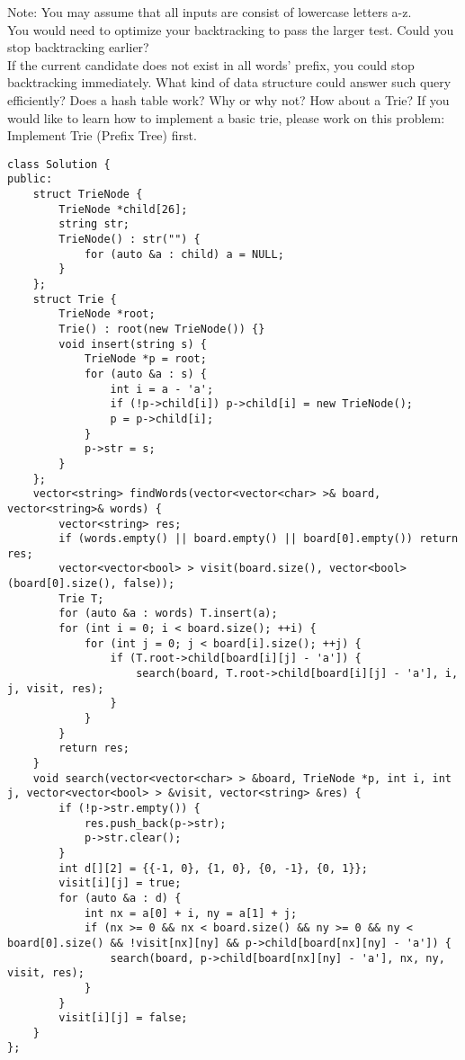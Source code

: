 Note:
You may assume that all inputs are consist of lowercase letters a-z.\\

You would need to optimize your backtracking to pass the larger test. Could you stop backtracking earlier?\\

If the current candidate does not exist in all words' prefix, you could stop backtracking immediately. What kind of data structure could answer such query efficiently? Does a hash table work? Why or why not? How about a Trie? If you would like to learn how to implement a basic trie, please work on this problem: Implement Trie (Prefix Tree) first.\\

\begin{lstlisting}
class Solution {
public:
    struct TrieNode {
        TrieNode *child[26];
        string str;
        TrieNode() : str("") {
            for (auto &a : child) a = NULL;
        }
    };
    struct Trie {
        TrieNode *root;
        Trie() : root(new TrieNode()) {}
        void insert(string s) {
            TrieNode *p = root;
            for (auto &a : s) {
                int i = a - 'a';
                if (!p->child[i]) p->child[i] = new TrieNode();
                p = p->child[i];
            }
            p->str = s;
        }
    };
    vector<string> findWords(vector<vector<char> >& board, vector<string>& words) {
        vector<string> res;
        if (words.empty() || board.empty() || board[0].empty()) return res;
        vector<vector<bool> > visit(board.size(), vector<bool>(board[0].size(), false));
        Trie T;
        for (auto &a : words) T.insert(a);
        for (int i = 0; i < board.size(); ++i) {
            for (int j = 0; j < board[i].size(); ++j) {
                if (T.root->child[board[i][j] - 'a']) {
                    search(board, T.root->child[board[i][j] - 'a'], i, j, visit, res);
                }
            }
        }
        return res;
    }
    void search(vector<vector<char> > &board, TrieNode *p, int i, int j, vector<vector<bool> > &visit, vector<string> &res) { 
        if (!p->str.empty()) {
            res.push_back(p->str);
            p->str.clear();
        }
        int d[][2] = {{-1, 0}, {1, 0}, {0, -1}, {0, 1}};
        visit[i][j] = true;
        for (auto &a : d) {
            int nx = a[0] + i, ny = a[1] + j;
            if (nx >= 0 && nx < board.size() && ny >= 0 && ny < board[0].size() && !visit[nx][ny] && p->child[board[nx][ny] - 'a']) {
                search(board, p->child[board[nx][ny] - 'a'], nx, ny, visit, res);
            }
        }
        visit[i][j] = false;
    }
};
\end{lstlisting}

